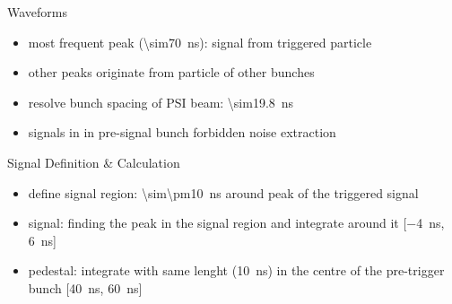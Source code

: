 \begin{frame}{Waveforms}

	\vspace*{-20pt}
	\vspace*{-20pt}
	\vspace*{-10pt}

	\begin{itemize}\itemfill
		\item most frequent peak (\SI{\sim70}{ns}): signal from triggered particle
		\item other peaks originate from particle of other bunches 
		\item resolve bunch spacing of PSI beam: \SI{\sim19.8}{ns}
		\item signals in in pre-signal bunch forbidden \ra noise extraction
	\end{itemize}
	
\end{frame}
\begin{frame}{Signal Definition \& Calculation}
 
	\vspace*{-10pt}
	
	\begin{itemize} \itemfill
		\item define signal region: \SI{\sim\pm10}{\nano\second} around peak of the triggered signal 
		\item signal: finding the peak in the signal region and integrate around it [\SI{-4}{\nano\second}, \SI{6}{\nano\second}]
		\item pedestal: integrate with same lenght (\SI{10}{\nano\second}) in the centre of the pre-trigger bunch [\SI{40}{\nano\second}, \SI{60}{\nano\second}]
	\end{itemize}
 
\end{frame}
